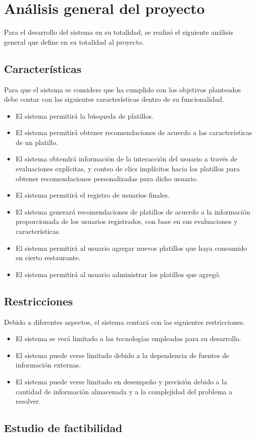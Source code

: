 \chapter{Análisis general del proyecto}
	Para el desarrollo del sistema en su totalidad, se realizó el siguiente análisis general que define en su totalidad al proyecto.

	\section{Características}
		Para que el sistema se considere que ha cumplido con los objetivos planteados debe contar con las siguientes características dentro de su funcionalidad.
		\begin{itemize}			
			\item El sistema permitirá la búsqueda de platillos.
			\item El sistema permitirá obtener recomendaciones de acuerdo a las características de un platillo.
			\item El sistema obtendrá información de la interacción del usuario a través de evaluaciones explícitas, y conteo de clics implícitos hacia los platillos para obtener recomendaciones personalizadas para dicho usuario.
			\item El sistema permitirá el registro de usuarios finales.
			\item El sistema generará recomendaciones de platillos de acuerdo a la información proporcionada de los usuarios registrados, con base en sus evaluaciones y características.
			\item El sistema permitirá al usuario agregar nuevos platillos que haya consumido en cierto restaurante.
			\item El sistema permitirá al usuario administrar los platillos que agregó. 
		\end{itemize}

	\section{Restricciones}
		Debido a diferentes aspectos, el sistema contará con las siguientes restricciones.
		\begin{itemize}
			\item El sistema se verá limitado a las tecnologías empleadas para su desarrollo.
			\item El sistema puede verse limitado debido a la dependencia de fuentes de información externas.
			\item El sistema puede verse limitado en desempeño y precisión debido a la cantidad de información almacenada y a la complejidad del problema a resolver.
		\end{itemize} 

	\section{Estudio de factibilidad}

	
	
	
